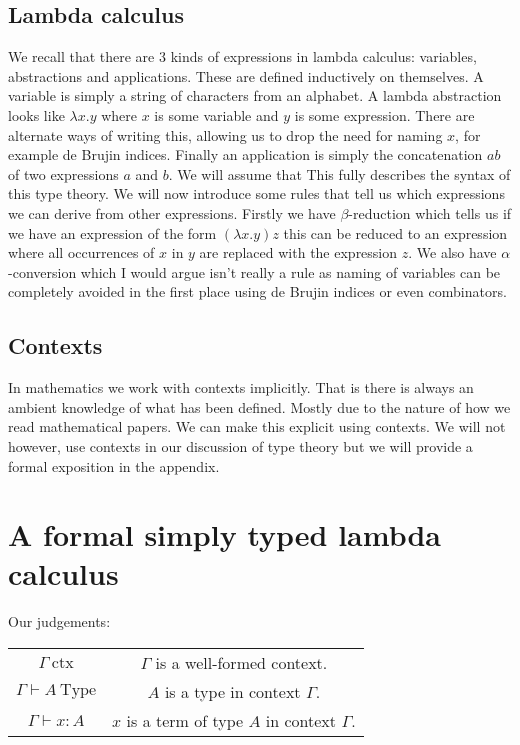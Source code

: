 %
%

\subsection{Lambda calculus}
We recall that there are 3 kinds of expressions in lambda calculus: variables, abstractions and applications. These are defined inductively on themselves. A variable is simply a string of characters from an alphabet. A lambda abstraction looks like $\lambda x.y$ where $x$ is some variable and $y$ is some expression. There are alternate ways of writing this, allowing us to drop the need for naming $x$, for example de Brujin indices. Finally an application is simply the concatenation $ab$ of two expressions $a$ and $b$. We will assume that  This fully describes the syntax of this type theory. We will now introduce some rules that tell us which expressions we can derive from other expressions. Firstly we have $\beta$-reduction which tells us if we have an expression of the form $(\lambda x . y)z$ this can be reduced to an expression where all occurrences of $x$ in $y$ are replaced with the expression $z$. We also have $\alpha$-conversion which I would argue isn't really a rule as naming of variables can be completely avoided in the first place using de Brujin indices or even combinators. \cite{BarendregtHenk2013Lcwt, hottbook}

\subsection{Contexts}
In mathematics we work with contexts implicitly. That is there is always an ambient knowledge of what has been defined. Mostly due to the nature of how we read mathematical papers. We can make this explicit using contexts. We will not however, use contexts in our discussion of type theory but we will provide a formal exposition in the appendix.

\newpage

\section{A formal simply typed lambda calculus}
Our judgements:
\begin{center}
    \begin{tabular}{c | c}
        $\Gamma\ \mathrm{ctx}$ &  $\Gamma$ is a well-formed context. \\
        $\Gamma \vdash A\ \mathrm{Type}$ & $A$ is a type in context $\Gamma$. \\
        $\Gamma \vdash x : A$ & $x$ is a term of type $A$ in context $\Gamma$. \\
    \end{tabular}
\end{center}

